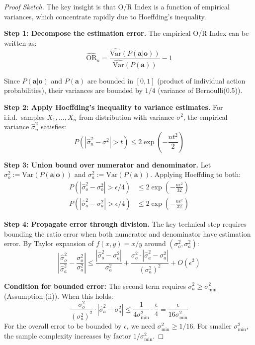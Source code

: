 \begin{proof}[Proof Sketch]
The key insight is that O/R Index is a function of empirical variances, which concentrate rapidly due to Hoeffding's inequality.

\textbf{Step 1: Decompose the estimation error.}
The empirical O/R Index can be written as:
\begin{equation}
\widehat{\text{OR}}_n = \frac{\widehat{\text{Var}}(P(\mathbf{a}|\mathbf{o}))}{\widehat{\text{Var}}(P(\mathbf{a}))} - 1
\end{equation}

Since $P(\mathbf{a}|\mathbf{o})$ and $P(\mathbf{a})$ are bounded in $[0,1]$ (product of individual action probabilities), their variances are bounded by $1/4$ (variance of Bernoulli(0.5)).

\textbf{Step 2: Apply Hoeffding's inequality to variance estimates.}
For i.i.d.\ samples $X_1, \dots, X_n$ from distribution with variance $\sigma^2$, the empirical variance $\widehat{\sigma}^2_n$ satisfies:
\begin{equation}
P\left(|\widehat{\sigma}^2_n - \sigma^2| > t\right) \leq 2\exp\left(-\frac{nt^2}{2}\right)
\end{equation}

\textbf{Step 3: Union bound over numerator and denominator.}
Let $\sigma^2_o := \text{Var}(P(\mathbf{a}|\mathbf{o}))$ and $\sigma^2_a := \text{Var}(P(\mathbf{a}))$. Applying Hoeffding to both:
\begin{align}
P\left(|\widehat{\sigma}^2_o - \sigma^2_o| > \epsilon/4\right) &\leq 2\exp\left(-\frac{n\epsilon^2}{32}\right) \\
P\left(|\widehat{\sigma}^2_a - \sigma^2_a| > \epsilon/4\right) &\leq 2\exp\left(-\frac{n\epsilon^2}{32}\right)
\end{align}

\textbf{Step 4: Propagate error through division.}
The key technical step requires bounding the ratio error when both numerator and denominator have estimation error. By Taylor expansion of $f(x,y) = x/y$ around $(\sigma^2_o, \sigma^2_a)$:
\begin{equation}
\left|\frac{\widehat{\sigma}^2_o}{\widehat{\sigma}^2_a} - \frac{\sigma^2_o}{\sigma^2_a}\right| \leq \frac{|\widehat{\sigma}^2_o - \sigma^2_o|}{\sigma^2_a} + \frac{\sigma^2_o \cdot |\widehat{\sigma}^2_a - \sigma^2_a|}{(\sigma^2_a)^2} + O(\epsilon^2)
\end{equation}

\textbf{Condition for bounded error:} The second term requires $\sigma^2_a \geq \sigma^2_{\min}$ (Assumption (ii)). When this holds:
\begin{equation}
\frac{\sigma^2_o}{(\sigma^2_a)^2} \cdot |\widehat{\sigma}^2_a - \sigma^2_a| \leq \frac{1}{4 \sigma^2_{\min}} \cdot \frac{\epsilon}{4} = \frac{\epsilon}{16\sigma^2_{\min}}
\end{equation}
For the overall error to be bounded by $\epsilon$, we need $\sigma^2_{\min} \geq 1/16$. For smaller $\sigma^2_{\min}$, the sample complexity increases by factor $1/\sigma^2_{\min}$.


\end{proof}
